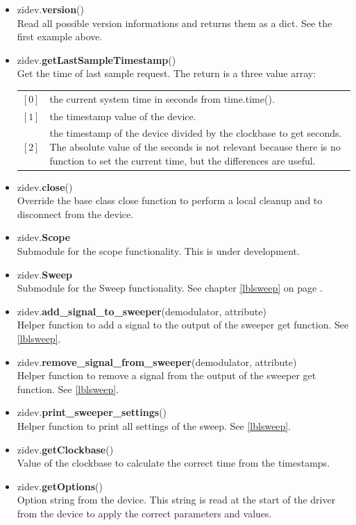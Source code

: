 \documentclass[11pt]{article} %
\begin{document}
\begin{itemize}
\item zidev.{\bf version}() \\
  	Read all possible version informations and returns them as a dict. See the first example above.

\item zidev.{\bf getLastSampleTimestamp}() \\
	Get the time of last sample request. The return is a three value array:
	\setlength{\LTleft}{1.5cm}
	\begin{longtable}{p{0.5cm}p{14.4cm}}
	 $[0]$ & the current system time in seconds from time.time(). \\
	 $[1]$ & the timestamp value of the device. \\
	 $[2]$ & the timestamp of the device divided by the clockbase to get seconds. The absolute value of the seconds is not relevant because there is no function to set the current time, but the differences are useful. \\
	\end{longtable}

\item zidev.{\bf close}() \\
	Override the base class close function to perform a local cleanup and to disconnect from the device.

\item zidev.{\bf Scope} \\
  	Submodule for the scope functionality. This is under development.

\item zidev.{\bf Sweep} \\
	Submodule for the Sweep functionality. See chapter \ref{lblsweep} on page \pageref{lblsweep}.
\item zidev.{\bf add\_signal\_to\_sweeper}(demodulator, attribute) \\
	Helper function to add a signal to the output of the sweeper get function. See \ref{lblsweep}.
\item zidev.{\bf remove\_signal\_from\_sweeper}(demodulator, attribute) \\
	Helper function to remove a signal from the output of the sweeper get function. See \ref{lblsweep}.
\item zidev.{\bf print\_sweeper\_settings}() \\
	Helper function to print all settings of the sweep. See \ref{lblsweep}.

\item zidev.{\bf getClockbase}() \\
	Value of the clockbase to calculate the correct time from the timestamps.

\item zidev.{\bf getOptions}() \\
	Option string from the device. This string is read at the start of the driver from the device to apply the correct parameters and values.
  
\end{itemize}
\end{document}
